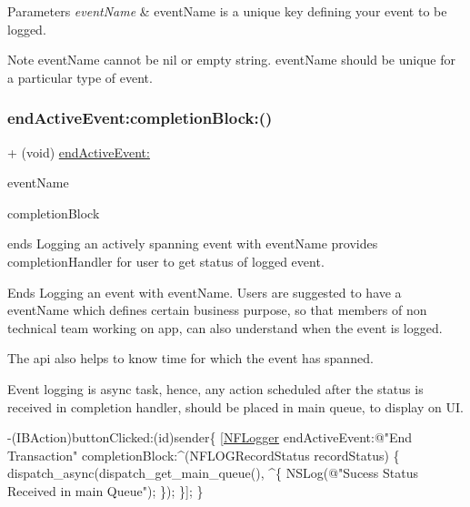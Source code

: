 \begin{DoxyParams}{Parameters}
{\em event\+Name} & event\+Name is a unique key defining your event to be logged. \\
\hline
\end{DoxyParams}
\begin{DoxyNote}{Note}
event\+Name cannot be nil or empty string. event\+Name should be unique for a particular type of event. 
\end{DoxyNote}
\mbox{\label{interface_n_f_logger_a72b51800e587c99090a5b8ce8788fa14}} 
\subsubsection{\texorpdfstring{end\+Active\+Event\+:completion\+Block\+:()}{endActiveEvent:completionBlock:()}}
{\footnotesize\ttfamily + (void) \hyperlink{interface_n_f_logger_a6cac38d011820ec21dc314c7a4d4aaf4}{end\+Active\+Event\+:} \begin{DoxyParamCaption}\item[{(N\+S\+String $\ast$)}]{event\+Name }\item[{completionBlock:(void($^\wedge$)(N\+F\+L\+O\+G\+Record\+Status record\+Status))}]{completion\+Block }\end{DoxyParamCaption}}



ends Logging an actively spanning event with event\+Name provides completion\+Handler for user to get status of logged event. 

Ends Logging an event with event\+Name. Users are suggested to have a event\+Name which defines certain business purpose, so that members of non technical team working on app, can also understand when the event is logged.

The api also helps to know time for which the event has spanned.

Event logging is async task, hence, any action scheduled after the status is received in completion handler, should be placed in main queue, to display on UI.


\begin{DoxyCode}
-(IBAction)buttonClicked:(\textcolor{keywordtype}{id})sender\{
 [\hyperlink{interface_n_f_logger}{NFLogger} endActiveEvent:\textcolor{stringliteral}{@"End Transaction"} completionBlock:^(NFLOGRecordStatus recordStatus) \{
      dispatch\_async(dispatch\_get\_main\_queue(), ^\{
          NSLog(\textcolor{stringliteral}{@"Sucess Status Received in main Queue"});
       \});
  \}];
\}
\end{DoxyCode}
 
